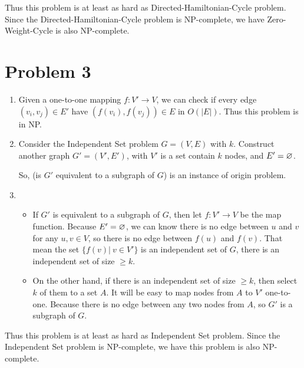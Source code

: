 \documentclass{article}
\def\o{\ensuremath\varnothing}
\begin{document}
Thus this problem is at least as hard as Directed-Hamiltonian-Cycle problem.
Since the Directed-Hamiltonian-Cycle problem is NP-complete, 
we have Zero-Weight-Cycle is also NP-complete.

\pagebreak
\section*{Problem 3}
\begin{enumerate}[1)]
    \item  Given a one-to-one mapping $f: V'\rightarrow V$, we can check if every edge $(v_i, v_j)\in E'$ have $(f(v_i),f(v_j)) \in E$ in $O(|E|)$.
    Thus this problem is in NP.
    \item Consider the Independent Set problem $G = (V, E)$ with $k$.
    Construct another graph $G'=(V',E')$, with $V'$ is a set contain $k$ nodes, and $E'=\o$.
    
    So, (is $G'$ equivalent to a subgraph of $G$) is an instance of origin problem. 
    \item 
    \begin{itemize}
        \item If $G'$ is equivalent to a subgraph of $G$, then let $f: V'\rightarrow V$ be the map function. 
        Because $E'=\o$, we can know there is no edge between $u$ and $v$ for any $u,v\in V$, so there is no edge between $f(u)$ and $f(v)$. That mean the set $\{f(v)|~v\in V'\}$ is an independent set of $G$, 
        there is an independent set of size $\geqslant k$.

        \item On the other hand, if there is an independent set of size $\geqslant k$, 
        then select $k$ of them to a set $A$.
        It will be easy to map nodes from $A$ to $V'$ one-to-one.
        Because there is no edge between any two nodes from $A$, 
        so $G'$ is a subgraph of $G$.
    \end{itemize}
\end{enumerate}

Thus this problem is at least as hard as Independent Set problem.
Since the Independent Set problem is NP-complete, 
we have this problem is also NP-complete.

\pagebreak
\end{document}
